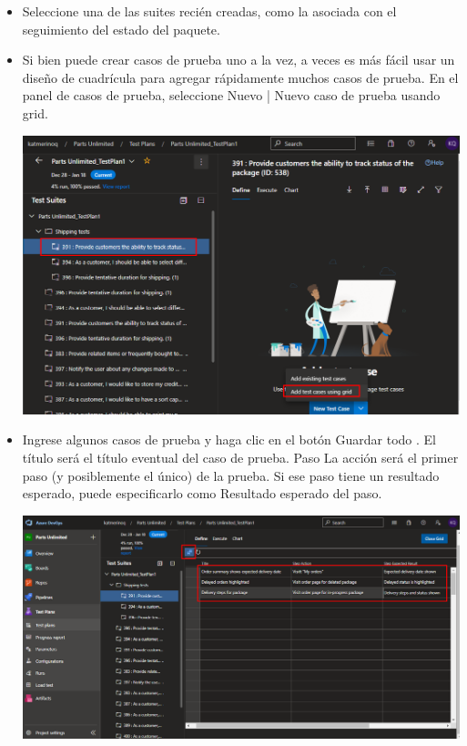 \begin{itemize}
\item Seleccione una de las suites recién creadas, como la asociada con el seguimiento del estado del paquete.
\item Si bien puede crear casos de prueba uno a la vez, a veces es más fácil usar un diseño de cuadrícula para agregar rápidamente muchos casos de prueba. En el panel de casos de prueba, seleccione Nuevo | Nuevo caso de prueba usando grid.
\begin{center}
\includegraphics[width=\columnwidth]{images/33}\newline
\end{center}

\item Ingrese algunos casos de prueba y haga clic en el botón Guardar todo . El título será el título eventual del caso de prueba. Paso La acción será el primer paso (y posiblemente el único) de la prueba. Si ese paso tiene un resultado esperado, puede especificarlo como Resultado esperado del paso.
\begin{center}
\includegraphics[width=\columnwidth]{images/34}\newline
\end{center}


\end{itemize}
